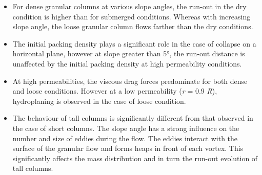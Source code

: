 \begin{itemize}
\item For dense granular columns at various slope angles, the run-out in the 
dry condition is higher than for submerged conditions. Whereas with increasing 
slope angle, the loose granular column flows farther than the dry conditions. 

\item The initial packing density plays a significant role in the case of 
collapse on a horizontal plane, however at slope greater than 5\si{\degree}, 
the run-out distance is unaffected by the initial packing density at high 
permeability conditions. 

\item At high permeabilities, the viscous drag forces predominate for both 
dense and loose conditions. However at a low permeability (\textit{r} = 0.9 
\textit{R}), 
hydroplaning is observed in the case of loose condition. 

\item The behaviour of tall columns is significantly different from that 
observed in the case of short columns. The slope angle has a strong influence 
on the number and size of eddies during the flow. The eddies interact with the 
surface of the granular flow and forms heaps in front of each vortex. This 
significantly affects the mass distribution and in turn the run-out evolution 
of tall columns. 

\end{itemize}